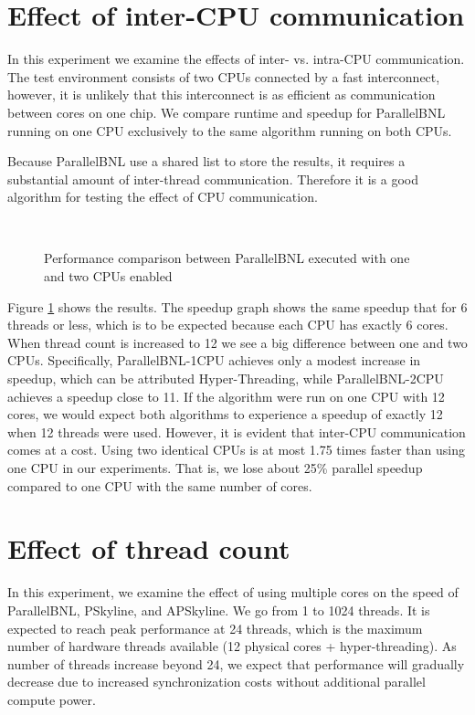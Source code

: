 \documentclass[12pt,a4paper,twoside]{report}
\begin{document}
\section{Effect of inter-CPU communication}

In this experiment we examine the effects of inter- vs. intra-CPU
communication. The test environment consists of two CPUs connected by
a fast interconnect, however, it is unlikely that this interconnect is
as efficient as communication between cores on one chip. We compare
runtime and speedup for ParallelBNL running on one CPU exclusively to
the same algorithm running on both CPUs.

Because ParallelBNL use a shared list to store the results, it
requires a substantial amount of inter-thread communication.
Therefore it is a good algorithm for testing the effect of CPU
communication.

\begin{figure}[H]
	\centering
		\\
	\caption{Performance comparison between ParallelBNL executed
	with one and two CPUs enabled}
	\label{fig:test-cpu}
\end{figure}

Figure \ref{fig:test-cpu} shows the results. The speedup graph
shows the same speedup that for 6 threads or less, which is to be
expected because each CPU has exactly 6 cores. When thread count
is increased to 12 we see a big difference between one and two
CPUs. Specifically, ParallelBNL-1CPU achieves only a modest
increase in speedup, which can be attributed Hyper-Threading,
while ParallelBNL-2CPU achieves a speedup close to 11. If the
algorithm were run on one CPU with 12 cores, we would expect
both algorithms to experience a speedup of exactly 12 when 12
threads were used. However, it is evident that inter-CPU
communication comes at a cost. Using two identical CPUs is at
most 1.75 times faster than using one CPU in our experiments. That
is, we lose about 25\% parallel speedup compared to one CPU with
the same number of cores.

\section{Effect of thread count}
\label{sec:test2}

In this experiment, we examine the effect of using multiple cores on the
speed of ParallelBNL, PSkyline, and APSkyline. We go from 1 to
1024 threads. It is expected to reach peak performance at 24
threads, which is the maximum number of hardware threads available
(12 physical cores + hyper-threading). As number of threads
increase beyond 24, we expect that performance will gradually
decrease due to increased synchronization costs without additional
parallel compute power. 
\end{document}

